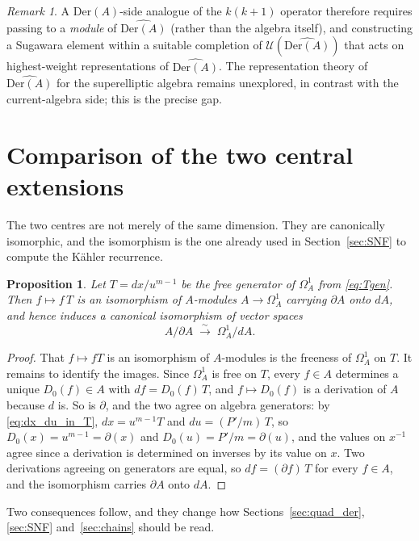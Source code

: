 \documentclass[11pt]{amsart}
\newtheorem{proposition}[theorem]{Proposition}
\theoremstyle{definition}
\theoremstyle{remark}
\newtheorem{remark}[theorem]{Remark}
\newcommand{\Der}{\mathrm{Der}}
\newcommand{\pa}{\partial}
\begin{document}
\begin{remark}
A $\Der(A)$-side analogue of the $k(k+1)$ operator therefore requires
passing to a \emph{module} of $\widehat{\Der(A)}$ (rather than the
algebra itself), and constructing a Sugawara element within a suitable
completion of $\mathcal{U}(\widehat{\Der(A)})$ that acts on
highest-weight representations of $\widehat{\Der(A)}$.
The representation theory of $\widehat{\Der(A)}$ for the superelliptic
algebra remains unexplored, in contrast with the current-algebra side; this is
the precise gap.
\end{remark}

\section{Comparison of the two central extensions}
\label{sec:comparison_dict}

The two centres are not merely of the same dimension. They are canonically
isomorphic, and the isomorphism is the one already used in
Section~\ref{sec:SNF} to compute the K\"ahler recurrence.

\begin{proposition}\label{prop:centres_iso}
Let $T=dx/u^{m-1}$ be the free generator of $\Omega^1_A$ from
\eqref{eq:Tgen}. Then $f\mapsto f\,T$ is an isomorphism of
$A$-modules $A\to\Omega^1_A$ carrying $\pa A$ onto $dA$, and hence induces a
canonical isomorphism of vector spaces
\[
  A/\pa A \;\xrightarrow{\ \sim\ }\; \Omega^1_A/dA .
\]
\end{proposition}

\begin{proof}
That $f\mapsto fT$ is an isomorphism of $A$-modules is the freeness of
$\Omega^1_A$ on $T$. It remains to identify the images. Since
$\Omega^1_A$ is free on $T$, every $f\in A$ determines a unique
$D_0(f)\in A$ with $df=D_0(f)\,T$, and $f\mapsto D_0(f)$ is a derivation
of $A$ because $d$ is. So is $\pa$, and the two agree on algebra generators: by
\eqref{eq:dx_du_in_T}, $dx=u^{m-1}T$ and $du=(P'/m)\,T$, so
$D_0(x)=u^{m-1}=\pa(x)$ and $D_0(u)=P'/m=\pa(u)$, and the values on $x^{-1}$
agree since a derivation is determined on inverses by its value on $x$. Two
derivations agreeing on generators are equal, so $df=(\pa f)\,T$ for
every $f\in A$, and the isomorphism carries $\pa A$ onto $dA$.
\end{proof}

Two consequences follow, and they change how Sections~\ref{sec:quad_der},
\ref{sec:SNF} and~\ref{sec:chains} should be read.
\end{document}
